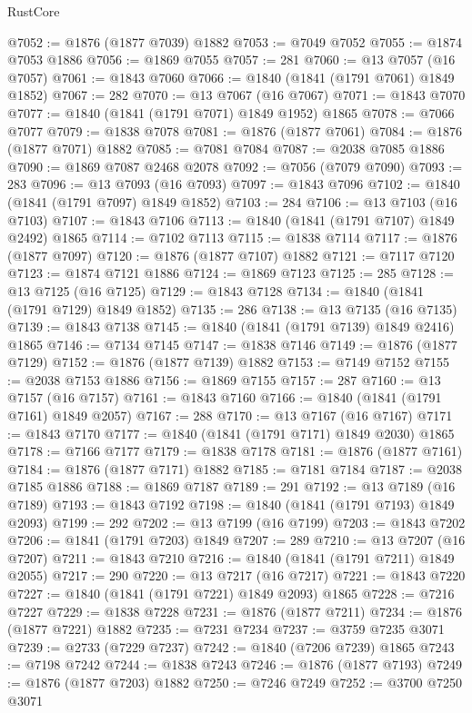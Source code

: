 \begin{lexlean}{RustCore}
\begin{coremodule}
@7052 := @1876 (@1877 @7039) @1882
@7053 := @7049 @7052
@7055 := @1874 @7053 @1886
@7056 := @1869 @7055
@7057 := 281
@7060 := @13 @7057 (@16 @7057)
@7061 := @1843 @7060
@7066 := @1840 (@1841 (@1791 @7061) @1849 @1852)
@7067 := 282
@7070 := @13 @7067 (@16 @7067)
@7071 := @1843 @7070
@7077 := @1840 (@1841 (@1791 @7071) @1849 @1952) @1865
@7078 := @7066 @7077
@7079 := @1838 @7078
@7081 := @1876 (@1877 @7061)
@7084 := @1876 (@1877 @7071) @1882
@7085 := @7081 @7084
@7087 := @2038 @7085 @1886
@7090 := @1869 @7087 @2468 @2078
@7092 := @7056 (@7079 @7090)
@7093 := 283
@7096 := @13 @7093 (@16 @7093)
@7097 := @1843 @7096
@7102 := @1840 (@1841 (@1791 @7097) @1849 @1852)
@7103 := 284
@7106 := @13 @7103 (@16 @7103)
@7107 := @1843 @7106
@7113 := @1840 (@1841 (@1791 @7107) @1849 @2492) @1865
@7114 := @7102 @7113
@7115 := @1838 @7114
@7117 := @1876 (@1877 @7097)
@7120 := @1876 (@1877 @7107) @1882
@7121 := @7117 @7120
@7123 := @1874 @7121 @1886
@7124 := @1869 @7123
@7125 := 285
@7128 := @13 @7125 (@16 @7125)
@7129 := @1843 @7128
@7134 := @1840 (@1841 (@1791 @7129) @1849 @1852)
@7135 := 286
@7138 := @13 @7135 (@16 @7135)
@7139 := @1843 @7138
@7145 := @1840 (@1841 (@1791 @7139) @1849 @2416) @1865
@7146 := @7134 @7145
@7147 := @1838 @7146
@7149 := @1876 (@1877 @7129)
@7152 := @1876 (@1877 @7139) @1882
@7153 := @7149 @7152
@7155 := @2038 @7153 @1886
@7156 := @1869 @7155
@7157 := 287
@7160 := @13 @7157 (@16 @7157)
@7161 := @1843 @7160
@7166 := @1840 (@1841 (@1791 @7161) @1849 @2057)
@7167 := 288
@7170 := @13 @7167 (@16 @7167)
@7171 := @1843 @7170
@7177 := @1840 (@1841 (@1791 @7171) @1849 @2030) @1865
@7178 := @7166 @7177
@7179 := @1838 @7178
@7181 := @1876 (@1877 @7161)
@7184 := @1876 (@1877 @7171) @1882
@7185 := @7181 @7184
@7187 := @2038 @7185 @1886
@7188 := @1869 @7187
@7189 := 291
@7192 := @13 @7189 (@16 @7189)
@7193 := @1843 @7192
@7198 := @1840 (@1841 (@1791 @7193) @1849 @2093)
@7199 := 292
@7202 := @13 @7199 (@16 @7199)
@7203 := @1843 @7202
@7206 := @1841 (@1791 @7203) @1849
@7207 := 289
@7210 := @13 @7207 (@16 @7207)
@7211 := @1843 @7210
@7216 := @1840 (@1841 (@1791 @7211) @1849 @2055)
@7217 := 290
@7220 := @13 @7217 (@16 @7217)
@7221 := @1843 @7220
@7227 := @1840 (@1841 (@1791 @7221) @1849 @2093) @1865
@7228 := @7216 @7227
@7229 := @1838 @7228
@7231 := @1876 (@1877 @7211)
@7234 := @1876 (@1877 @7221) @1882
@7235 := @7231 @7234
@7237 := @3759 @7235 @3071
@7239 := @2733 (@7229 @7237)
@7242 := @1840 (@7206 @7239) @1865
@7243 := @7198 @7242
@7244 := @1838 @7243
@7246 := @1876 (@1877 @7193)
@7249 := @1876 (@1877 @7203) @1882
@7250 := @7246 @7249
@7252 := @3700 @7250 @3071

\end{coremodule}
\end{lexlean}
